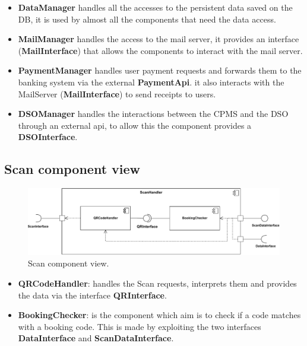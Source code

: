 \begin{itemize}
    \item \textbf{DataManager} handles all the accesses to the persistent data saved on the DB, it is used by almost all the components that need the data access.
    \item \textbf{MailManager} handles the access to the mail server, it provides an interface (\textbf{MailInterface}) that allows the components to interact with the mail server.
    \item \textbf{PaymentManager} handles user payment requests and forwards them to the banking system via the external \textbf{PaymentApi}. it also interacts with the MailServer (\textbf{MailInterface}) to send receipts to users.
    \item \textbf{DSOManager} handles the interactions between the CPMS and the DSO through an external api, to allow this the component provides a \textbf{DSOInterface}.
\end{itemize}
\subsection{Scan component view}
\begin{figure}[H]
    \centering
    \includegraphics[width=\textwidth]{images/ScanComponent.pdf}
    \caption{Scan component view.}
    \label{fig:scan_comp}
\end{figure}
\begin{itemize}
    \item \textbf{QRCodeHandler}: handles the Scan requests, interprets them and provides the data via the interface \textbf{QRInterface}.
    \item \textbf{BookingChecker}: is the component which aim is to check if a code matches with a booking code. This is made by exploiting the two interfaces \textbf{DataInterface} and \textbf{ScanDataInterface}.
\end{itemize}
